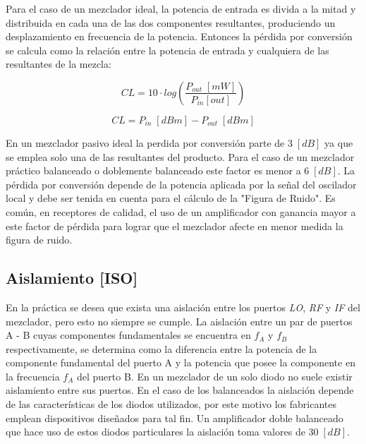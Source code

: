 \documentclass[twocolumn]{article}
\begin{document}
Para el caso de un mezclador ideal, la potencia de entrada es divida a la mitad y distribuida en cada una de las dos componentes resultantes, produciendo un desplazamiento en frecuencia de la potencia. Entonces la pérdida por conversión se calcula como la relación entre la potencia de entrada y cualquiera de las resultantes de la mezcla:

\[CL = 10 \cdot log \left( \frac{P_{out} \; [mW]}{P_{in} [out]} \right) \]

\begin{equation}
CL = P_{in} \; [dBm]- P_{out} \; [dBm] \label{eq:1}
\end{equation}

En un mezclador pasivo ideal la perdida por conversión parte de $3 \; [dB]$ ya que se emplea solo una de las resultantes del producto. Para el caso de un mezclador práctico balanceado o doblemente balanceado este factor es menor a $6 \; [dB]$. La pérdida por conversión depende de la potencia aplicada por la señal del oscilador local y debe ser tenida en cuenta para el cálculo de la "Figura de Ruido". Es común, en receptores de calidad, el uso de un amplificador con ganancia mayor a este factor de pérdida para lograr que el mezclador afecte en menor medida la figura de ruido.

\subsection{Aislamiento [ISO]}
En la práctica se desea que exista una aislación entre los puertos \textit{LO}, \textit{RF} y \textit{IF} del mezclador, pero esto no siempre se cumple. La aislación entre un par de puertos A - B cuyas componentes fundamentales se encuentra en $f_A$ y $f_B$ respectivamente, se determina como la diferencia entre la potencia de la componente fundamental del puerto A y la potencia que posee la componente en la frecuencia $f_A$ del puerto B. En un mezclador de un solo diodo no suele existir aislamiento entre sus puertos. En el caso de los balanceados la aislación depende de las características de los diodos utilizados, por este motivo los fabricantes emplean dispositivos diseñados para tal fin. Un amplificador doble balanceado que hace uso de estos diodos particulares la aislación toma valores de $30 \; [dB]$. 
\end{document}

